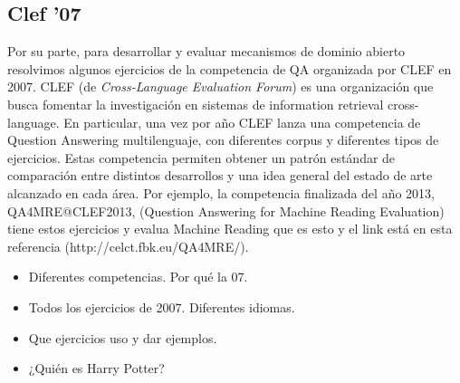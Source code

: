 \subsection{Clef '07}
Por su parte, para desarrollar y evaluar mecanismos de dominio abierto resolvimos algunos ejercicios de la competencia de QA organizada por CLEF 
en 2007. 
CLEF (de \textit{Cross-Language Evaluation Forum}) es una organización que busca fomentar la investigación en sistemas de information retrieval cross-language. 
En particular, una vez por año CLEF lanza una competencia de Question Answering multilenguaje, con diferentes corpus y diferentes tipos de ejercicios. Estas competencia permiten obtener un patrón estándar de comparación entre distintos desarrollos y una idea general del estado de arte alcanzado en cada área.
Por ejemplo, la competencia finalizada del año 2013, QA4MRE@CLEF2013, (Question Answering for Machine Reading Evaluation) tiene estos ejercicios y evalua Machine Reading que es esto y el link está en esta referencia (http://celct.fbk.eu/QA4MRE/).

\begin{itemize}
\item Diferentes competencias. Por qué la 07.
\item Todos los ejercicios de 2007. Diferentes idiomas. 
\item Que ejercicios uso y dar ejemplos. 
\item ¿Quién es Harry Potter?
\end{itemize}

 

 
